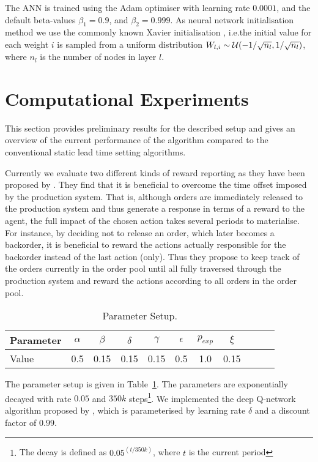 \documentclass[envcountsame]{llncs}
\begin{document}
The ANN is trained using the Adam optimiser \citep{kingma2014adam} with learning rate \(0.0001\),
and the default beta-values \(\beta_{1}=0.9\), and \(\beta_{2}=0.999\). As neural network
initialisation method we use the commonly known Xavier initialisation
\citep{glorot2010understanding}, i.e.\@ the initial value for each weight \(i\) is sampled from a
uniform distribution \(W_{l,i} \sim \mathcal{U}(-1/\sqrt{n_l},1/\sqrt{n_l})\), where \(n_{l}\) is the
number of nodes in layer \(l\).


\section{Computational Experiments}
\label{sec:Preliminary}

This section provides preliminary results for the described setup and gives an overview of the
current performance of the algorithm compared to the conventional static lead time setting
algorithms.

Currently we evaluate two different kinds of reward reporting as they have been proposed by
\cite{Schneckenreither2019}. They find that it is beneficial to overcome the time offset imposed by
the production system. That is, although orders are immediately released to the production system
and thus generate a response in terms of a reward to the agent, the full impact of the chosen action
takes several periods to materialise. For instance, by deciding not to release an order, which later
becomes a backorder, it is beneficial to reward the actions actually responsible for the backorder
instead of the last action (only). Thus they propose to keep track of the orders currently in the
order pool until all fully traversed through the production system and reward the actions according
to all orders in the order pool.

\begin{table}[t]
  \centering
  \begin{tabular}{|l||c|c|c|c|c|c|c|c|c|c|}
    \hline
    Parameter & $\alpha$ & $\beta$ & $\delta$ & $\gamma$ & $\epsilon$ & $p_{exp}$ & $\xi$ \\
    \hline
    Value & 0.5 & 0.15 & 0.15 & 0.15 & 0.5 & 1.0 & 0.15 \\
    \hline
  \end{tabular}
  \caption{\label{tbl:params}Parameter Setup.}
\end{table}

The parameter setup is given in Table~\ref{tbl:params}. The parameters are exponentially decayed
with rate \(0.05\) and \(350k\) steps\footnote{The decay is defined as \(0.05 ^{(t/350k)}\), where
  \(t\) is the current period}. We implemented the deep Q-network algorithm proposed by
\cite{mnih2015human}, which is parameterised by learning rate \(\delta\) and a discount factor of
\(0.99\).
\end{document}

